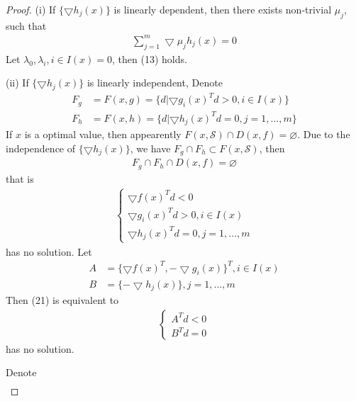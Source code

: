 \documentclass[runningheads]{llncs}
\begin{document}
\begin{proof}
    (i) If $\{\bigtriangledown h_j (x)\}$ is linearly dependent,
    then there exists non-trivial $\mu_j$, such that
    \begin{align}
        \sum_{j=1}^m \bigtriangledown \mu_jh_j (x) = 0
    \end{align}
    Let $\lambda_0, \lambda_i, i \in I(x) = 0$, then (13) holds.
    \par
    (ii) If $\{\bigtriangledown h_j (x)\}$ is linearly independent,
    Denote
    \begin{align}
        F_g &= F(x, g) = \{ d | \bigtriangledown g_i(x)^Td > 0, i \in I(x)\} \\
        F_h &= F(x, h) = \{ d | \bigtriangledown h_j(x)^Td = 0, j = 1,...,m\}
    \end{align}
    If $x$ is a optimal value, then appearently 
    $F(x, \mathcal{S}) \cap D(x, f) = \varnothing$.
    Due to the independence of $\{\bigtriangledown h_j (x)\}$,
    we have {\color{red}$F_g \cap F_h \subset F(x, \mathcal{S})$},
    then 
    \begin{align}
        F_g \cap F_h \cap D(x, f) = \varnothing
    \end{align}
    that is
    \begin{align}
        \left\{
        \begin{array}{ll}
            \bigtriangledown f(x)^Td < 0 \\
            \bigtriangledown g_i(x)^Td > 0, i \in I(x) \\
            \bigtriangledown h_j (x)^Td  =0, j = 1,...,m
        \end{array}
        \right.
    \end{align}
    has no solution.
    Let 
    \begin{align}
        A &= \{ \bigtriangledown f(x)^T, -\bigtriangledown g_i(x)\}^T, i \in I(x) \\
        B &= \{ -\bigtriangledown h_j(x)\}, j = 1,...,m
    \end{align}
    Then (21) is equivalent to
    \begin{align}
        \left\{
        \begin{array}{ll}
            A^T d < 0 \\
            B^T d = 0
        \end{array}
        \right.
    \end{align}
    has no solution.
    \par
    \noindent
    Denote
    \begin{align}

\end{align}
\end{proof}
\end{document}
